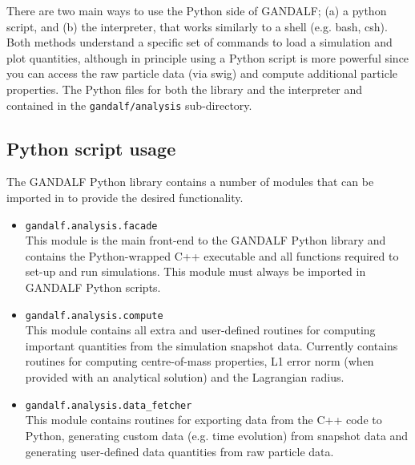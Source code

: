 \documentclass[a4paper]{article}
\newcommand{\var}[1]{\texttt{#1}}
\begin{document}
There are two main ways to use the Python side of GANDALF; (a) a python script, and  (b) the interpreter, that works similarly to a shell (e.g. bash, csh).  Both methods understand a specific set of commands to load a simulation and plot quantities, although in principle using a Python script is more powerful %
since you can access the raw particle data (via swig) and compute additional particle properties.  The Python files for both the library and the interpreter and contained in the \var{gandalf/analysis} sub-directory.



\subsection{Python script usage}
The GANDALF Python library contains a number of modules that can be imported in to provide the desired functionality.
\begin{itemize}
\item \var{gandalf.analysis.facade} \\
\noindent This module is the main front-end to the GANDALF Python library and contains the Python-wrapped C++ executable and all functions required to set-up and run simulations.  This module must always be imported in GANDALF Python scripts.
\item \var{gandalf.analysis.compute} \\
\noindent This module contains all extra and user-defined routines for computing important quantities from the simulation snapshot data.  Currently contains routines for computing centre-of-mass properties, L1 error norm (when provided with an analytical solution) and the Lagrangian radius.
\item \var{gandalf.analysis.data\_fetcher} \\
This module contains routines for exporting data from the C++ code to Python, generating custom data (e.g. time evolution) from snapshot data and generating user-defined data quantities from raw particle data.
\end{itemize}
\end{document}
